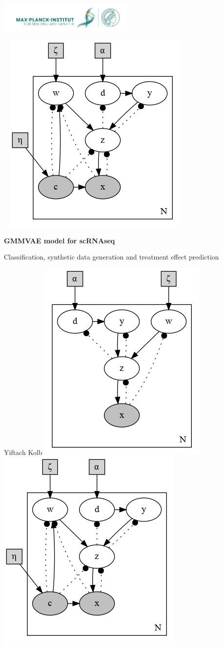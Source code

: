 \documentclass[final]{beamer}
\begin{document}
\begin{frame}[t]
\begin{center}
\includegraphics[width=0.5\textwidth]{images/MPIMG_RGB_gruen.png}\\

\begin{block}

~ \includegraphics[width=0.22\linewidth]{plots/dirichlet_gmm_cvae.gv.png}

\Large
\textbf{GMMVAE model for scRNAseq
}
\vspace{0.5cm}


\large
Classification, synthetic data generation and treatment effect
prediction 

\vspace{1.0cm}

Yiftach Kolb
\includegraphics[width=0.22\linewidth]{plots/dirichlet_gmm.gv.png}
~
\includegraphics[width=0.22\linewidth]{plots/dirichlet_gmm_cvae.gv.png}


\end{block}
\end{center}
\end{frame}
\end{document}

